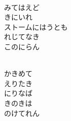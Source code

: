 \documentclass[10pt,b5j]{tarticle} %
\begin{document}
\begin{enumerate}
\begin{minipage}[c]{\blocksize}
        \vspace{\linespace}
        \item~\\
        みてはえど\\
        きにいれ\\
        ストームにはうとも\\
        れじてなき\\
        このにらん
        
    \end{minipage}
    \begin{minipage}[c]{\blocksize}
        
        \vspace{\linespace}
        \item~\\
        かきめて\\
        えりたき\\
        にりなば\\
        きのきは\\
        のけてれん
    
    \end{minipage}
\end{enumerate} %
\end{document}
